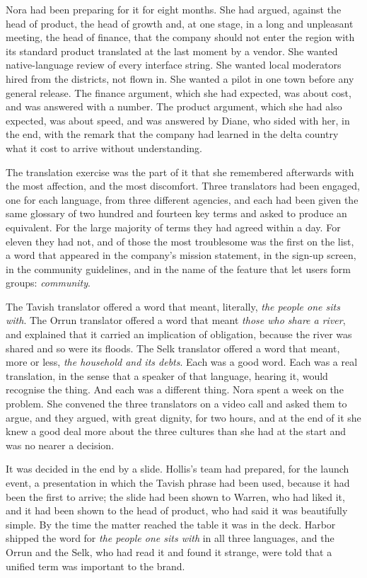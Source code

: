 Nora had been preparing for it for eight months. She had argued, against the head of product, the head of growth and, at one stage, in a long and unpleasant meeting, the head of finance, that the company should not enter the region with its standard product translated at the last moment by a vendor. She wanted native-language review of every interface string. She wanted local moderators hired from the districts, not flown in. She wanted a pilot in one town before any general release. The finance argument, which she had expected, was about cost, and was answered with a number. The product argument, which she had also expected, was about speed, and was answered by Diane, who sided with her, in the end, with the remark that the company had learned in the delta country what it cost to arrive without understanding.

The translation exercise was the part of it that she remembered afterwards with the most affection, and the most discomfort. Three translators had been engaged, one for each language, from three different agencies, and each had been given the same glossary of two hundred and fourteen key terms and asked to produce an equivalent. For the large majority of terms they had agreed within a day. For eleven they had not, and of those the most troublesome was the first on the list, a word that appeared in the company's mission statement, in the sign-up screen, in the community guidelines, and in the name of the feature that let users form groups: \emph{community}.

The Tavish translator offered a word that meant, literally, \emph{the people one sits with}. The Orrun translator offered a word that meant \emph{those who share a river}, and explained that it carried an implication of obligation, because the river was shared and so were its floods. The Selk translator offered a word that meant, more or less, \emph{the household and its debts}. Each was a good word. Each was a real translation, in the sense that a speaker of that language, hearing it, would recognise the thing. And each was a different thing. Nora spent a week on the problem. She convened the three translators on a video call and asked them to argue, and they argued, with great dignity, for two hours, and at the end of it she knew a good deal more about the three cultures than she had at the start and was no nearer a decision.

It was decided in the end by a slide. Hollis's team had prepared, for the launch event, a presentation in which the Tavish phrase had been used, because it had been the first to arrive; the slide had been shown to Warren, who had liked it, and it had been shown to the head of product, who had said it was beautifully simple. By the time the matter reached the table it was in the deck. Harbor shipped the word for \emph{the people one sits with} in all three languages, and the Orrun and the Selk, who had read it and found it strange, were told that a unified term was important to the brand.

